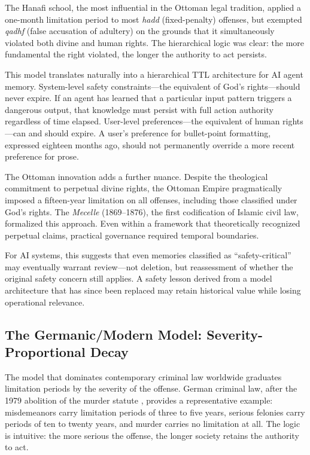 \documentclass[12pt]{article}
\begin{document}
The Hanafi school, the most influential in the Ottoman legal tradition, applied a one-month limitation period to most \emph{hadd} (fixed-penalty) offenses, but exempted \emph{qadhf} (false accusation of adultery) on the grounds that it simultaneously violated both divine and human rights. The hierarchical logic was clear: the more fundamental the right violated, the longer the authority to act persists.

This model translates naturally into a hierarchical TTL architecture for AI agent memory. System-level safety constraints---the equivalent of God's rights---should never expire. If an agent has learned that a particular input pattern triggers a dangerous output, that knowledge must persist with full action authority regardless of time elapsed. User-level preferences---the equivalent of human rights---can and should expire. A user's preference for bullet-point formatting, expressed eighteen months ago, should not permanently override a more recent preference for prose.

The Ottoman innovation adds a further nuance. Despite the theological commitment to perpetual divine rights, the Ottoman Empire pragmatically imposed a fifteen-year limitation on all offenses, including those classified under God's rights. The \emph{Mecelle} (1869--1876), the first codification of Islamic civil law, formalized this approach. Even within a framework that theoretically recognized perpetual claims, practical governance required temporal boundaries.

For AI systems, this suggests that even memories classified as ``safety-critical'' may eventually warrant review---not deletion, but reassessment of whether the original safety concern still applies. A safety lesson derived from a model architecture that has since been replaced may retain historical value while losing operational relevance.

\subsection{The Germanic/Modern Model: Severity-Proportional Decay}
\label{sec:germanic}

The model that dominates contemporary criminal law worldwide graduates limitation periods by the severity of the offense. German criminal law, after the 1979 abolition of the murder statute \citep{german-verjaehrung}, provides a representative example: misdemeanors carry limitation periods of three to five years, serious felonies carry periods of ten to twenty years, and murder carries no limitation at all. The logic is intuitive: the more serious the offense, the longer society retains the authority to act.
\end{document}
